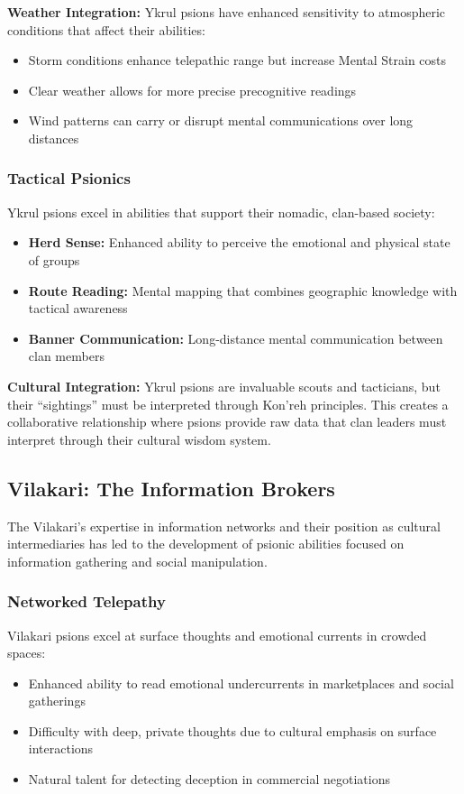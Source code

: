 \documentclass[11pt,twoside]{article}
\begin{document}
\textbf{Weather Integration:} Ykrul psions have enhanced sensitivity to atmospheric conditions that affect their abilities:
\begin{itemize}
    \item Storm conditions enhance telepathic range but increase Mental Strain costs
    \item Clear weather allows for more precise precognitive readings
    \item Wind patterns can carry or disrupt mental communications over long distances
\end{itemize}

\subsubsection{Tactical Psionics}
Ykrul psions excel in abilities that support their nomadic, clan-based society:
\begin{itemize}
    \item \textbf{Herd Sense:} Enhanced ability to perceive the emotional and physical state of groups
    \item \textbf{Route Reading:} Mental mapping that combines geographic knowledge with tactical awareness
    \item \textbf{Banner Communication:} Long-distance mental communication between clan members
\end{itemize}

\textbf{Cultural Integration:} Ykrul psions are invaluable scouts and tacticians, but their ``sightings'' must be interpreted through Kon'reh principles. This creates a collaborative relationship where psions provide raw data that clan leaders must interpret through their cultural wisdom system.

\subsection{Vilakari: The Information Brokers}

The Vilakari's expertise in information networks and their position as cultural intermediaries has led to the development of psionic abilities focused on information gathering and social manipulation.

\subsubsection{Networked Telepathy}
Vilakari psions excel at surface thoughts and emotional currents in crowded spaces:
\begin{itemize}
    \item Enhanced ability to read emotional undercurrents in marketplaces and social gatherings
    \item Difficulty with deep, private thoughts due to cultural emphasis on surface interactions
    \item Natural talent for detecting deception in commercial negotiations
\end{itemize}
\end{document}
